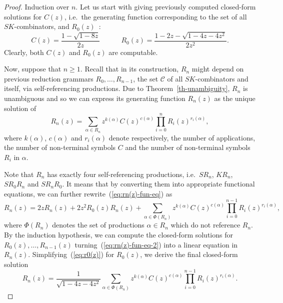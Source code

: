 \documentclass[11pt,a4paper]{amsart}
\theoremstyle{definition}
\begin{document}
\begin{proof}
Induction over $n$.  Let us start with giving previously computed closed-form solutions for $C(z)$, i.e.~the generating function corresponding to the set of all $S K$-combinators, and $R_0(z)$~\cite{Bendkowski2015}:
\begin{equation}\label{eq:r0(z)}
C(z) = \frac{1 - \sqrt{1 - 8z}}{2 z} \qquad \quad R_0(z) = \frac{1 - 2 z - \sqrt{1- 4 z - 4 z^2}}{2 z^2}.
\end{equation}
Clearly, both $C(z)$ and $R_0(z)$ are computable.

Now, suppose that $n \geq 1$. Recall that in its construction, $R_n$ might depend on previous reduction grammars $R_0, \ldots, R_{n-1}$, the set $\mathcal{C}$ of all $S K$-combinators and itself, via self-referencing productions. Due to Theorem~\ref{th-unambiguity}, $R_n$ is unambiguous and so we can express its generating function $R_n(z)$ as the unique solution of
\begin{equation}\label{eq:rn(z)-fun-eq}
R_n(z) = \sum_{\alpha \in R_n} z^{k(\alpha)} {C(z)}^{c(\alpha)} \prod_{i=0}^{n} {R_i(z)}^{r_i(\alpha)},
\end{equation}
where $k(\alpha)$, $c(\alpha)$ and $r_i(\alpha)$ denote respectively, the number of applications, the number of non-terminal symbols $C$ and the number of non-terminal symbols $R_i$ in $\alpha$.

Note that $R_n$ has exactly four self-referencing productions, i.e.~$S R_n$, $K R_n$, $S R_0 R_n$ and $S R_n R_0$. It means that by converting them into appropriate functional equations, we can further rewrite~(\ref{eq:rn(z)-fun-eq}) as
\begin{equation}\label{eq:rn(z)-fun-eq-2}
R_n(z) = 2 z R_n(z) + 2 z^2 R_0(z) R_n(z) + \sum_{\alpha \in \Phi(R_n)} z^{k(\alpha)} {C(z)}^{c(\alpha)} \prod_{i=0}^{n-1} {R_i(z)}^{r_i(\alpha)},
\end{equation}
where $\Phi(R_n)$ denotes the set of productions $\alpha \in R_n$ which do not reference $R_n$. By the induction hypothesis, we can compute the closed-form solutions for $R_0(z), \ldots, R_{n-1}(z)$ turning~(\ref{eq:rn(z)-fun-eq-2}) into a linear equation in $R_n(z)$. Simplifying~(\ref{eq:r0(z)}) for $R_0(z)$, we derive the final closed-form solution
\begin{equation*}\label{eq:rn(z)-fun-eq-simplified}
R_n(z) = \frac{1}{\sqrt{1-4 z - 4 z^2}} \sum_{\alpha \in \Phi(R_n)} z^{k(\alpha)} {C(z)}^{c(\alpha)} \prod_{i=0}^{n-1} {R_i(z)}^{r_i(\alpha)}.
\end{equation*}
\end{proof}
\end{document}

